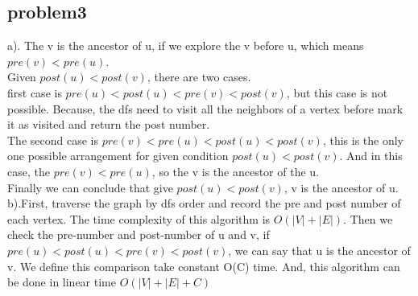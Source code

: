 \documentclass[11pt]{article}
\begin{document}
\subsection{problem3}
a). The v is the ancestor of u, if we explore the v before u, which means $pre(v)<pre(u)$.\\
Given $post(u)<post(v)$, there are two cases. \\ 
first case is $pre(u)<post(u)<pre(v)<post(v)$, but this case is not possible. Because, the dfs need to visit all the neighbors of a vertex before mark it as visited and return the post number. \\
The second case is $pre(v)<pre(u)<post(u)<post(v)$, this is the only one possible arrangement for given condition $post(u)<post(v)$. And in this case, the $pre(v)<pre(u)$, so the v is the ancestor of the u.\\
Finally we can conclude that give $post(u)<post(v)$, v is the ancestor of u. \\
b).First, traverse the graph by dfs order and record the pre and post number of each vertex. The time complexity of this algorithm is $O(|V|+|E|)$. Then we check the pre-number and post-number of u and v, if $pre(u)<post(u)<pre(v)<post(v)$, we can say that u is the ancestor of v. We define this comparison take constant O(C) time. And, this algorithm can be done in linear time $O(|V|+|E|+C)$
\end{document}
